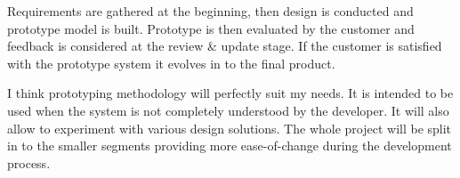 \documentclass[]{report}
\begin{document}
Requirements are gathered at the beginning, then design is conducted and prototype model is built. Prototype is then evaluated by the customer and feedback is considered at the review \& update stage. If the customer is satisfied with the prototype system it evolves in to the final product. 

I think prototyping methodology will perfectly suit my needs. It is intended to be used when the system is not completely understood by the developer. It will also allow to experiment with various design solutions. The whole project will be split in to the smaller segments providing more ease-of-change during the development process. 



\end{document}

